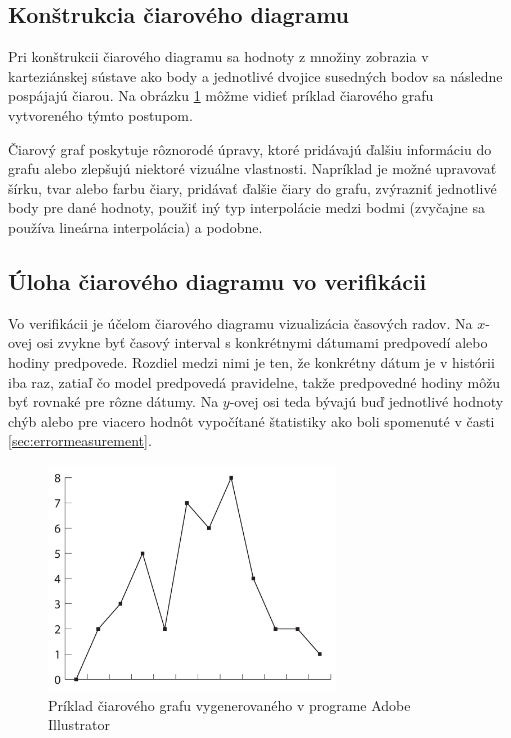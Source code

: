 \subsection{Konštrukcia čiarového diagramu}
Pri konštrukcii čiarového diagramu sa hodnoty z množiny zobrazia v karteziánskej sústave ako body a jednotlivé dvojice susedných bodov sa následne pospájajú čiarou. Na obrázku \ref{fig:linegraph} môžme vidieť príklad čiarového grafu vytvoreného týmto postupom.

Čiarový graf poskytuje rôznorodé úpravy, ktoré pridávajú ďalšiu informáciu do grafu alebo zlepšujú niektoré vizuálne vlastnosti. Napríklad je možné upravovať šírku, tvar alebo farbu čiary, pridávať ďalšie čiary do grafu, zvýrazniť jednotlivé body pre dané hodnoty, použiť iný typ interpolácie medzi bodmi (zvyčajne sa používa lineárna interpolácia) a podobne.

\subsection{Úloha čiarového diagramu vo verifikácii}
Vo verifikácii je účelom čiarového diagramu vizualizácia časových radov. Na \mbox{$ x $-ovej} osi zvykne byť časový interval s konkrétnymi dátumami predpovedí alebo hodiny predpovede. Rozdiel medzi nimi je ten, že konkrétny dátum je v histórii iba raz, zatiaľ čo model predpovedá pravidelne, takže predpovedné hodiny môžu byť rovnaké pre rôzne dátumy. Na \mbox{$ y $-ovej} osi teda bývajú buď jednotlivé hodnoty chýb alebo pre viacero hodnôt vypočítané štatistiky ako boli spomenuté v časti \ref{sec:errormeasurement}.
 

\begin{figure}
	\centering
	\includegraphics[width = 3in]{linegraph}
	\caption{Príklad čiarového grafu vygenerovaného v programe Adobe Illustrator}
	\label{fig:linegraph}
\end{figure}

